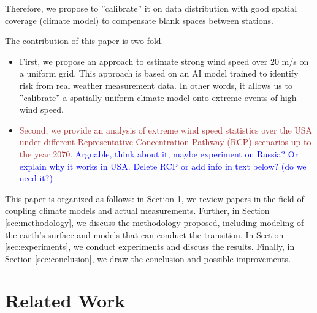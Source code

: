 \documentclass{article}
\begin{document}
Therefore, we propose to ''calibrate'' it on data distribution with good spatial coverage (climate model) to compensate blank spaces between stations.

The contribution of this paper is two-fold. 
\begin{itemize}
    \item First, we propose an approach to estimate strong wind speed over $20$ m/s on a uniform grid. This approach is based on an AI model trained to identify risk from real weather measurement data. In other words, it allows us to ''calibrate'' a spatially uniform climate model onto extreme events of high wind speed.
    \item \textcolor{brown}{Second, we provide an analysis of extreme wind speed statistics over the USA under different Representative Concentration Pathway (RCP) scenarios up to the year 2070.} \textcolor{blue}{Arguable, think about it, maybe experiment on Russia? Or explain why it works in USA. Delete RCP or add info in text below? (do we need it?)}
\end{itemize}


This paper is organized as follows: in Section \ref{sec:rel_work}, we review papers in the field of coupling climate models and actual measurements. Further, in Section \ref{sec:methodology}, we discuss the methodology proposed, including modeling of the earth's surface and models that can conduct the transition. In Section \ref{sec:experiments}, we conduct experiments and discuss the results. Finally, in Section \ref{sec:conclusion}, we draw the conclusion and possible improvements.
\raggedbottom

\section{Related Work}
\label{sec:rel_work}
\end{document}
